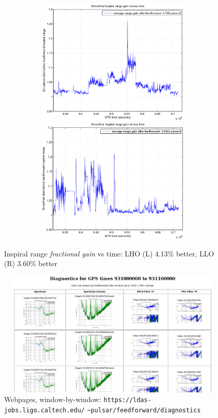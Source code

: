 \begin{figure}
\includegraphics[height=60mm, width=120mm]{clip-gain-LHO-new.eps}
\includegraphics[height=60mm, width=120mm]{clip-gain-LLO-new.eps}
\caption{Inspiral range \textit{fractional gain} vs time:
LHO (L) 4.13\% better, LLO (R) 3.60\% better}
\end{figure}
\begin{figure}
\includegraphics[height=60mm, width=120mm]{croppedWebpage.eps}
\caption{Webpages, window-by-window: \newline \texttt{https://ldas-jobs.ligo.caltech.edu/} \texttt{\~{}pulsar/feedforward/diagnostics}}
\end{figure}

